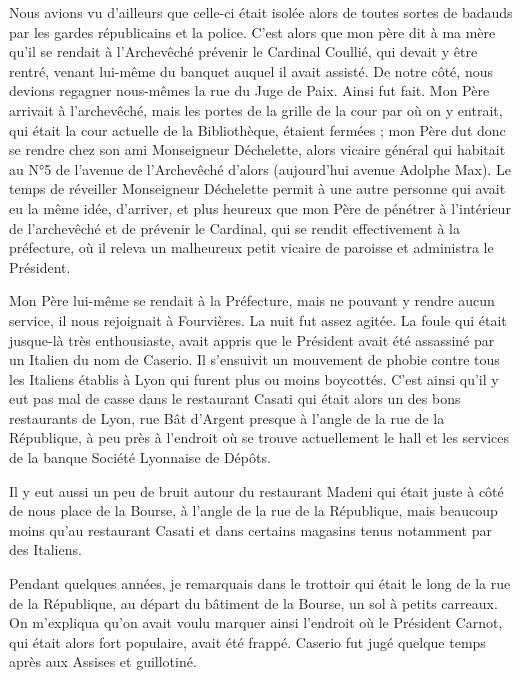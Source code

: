 \documentclass[11pt,a4paper]{report}
\begin{document}
Nous avions vu d'ailleurs que celle-ci était isolée alors de toutes sortes de badauds par les gardes républicains et la police. C'est alors que mon père dit à ma mère qu'il se rendait à l'Archevêché prévenir le Cardinal Coullié, qui devait y être rentré, venant lui-même du banquet auquel il avait assisté. De notre côté, nous devions regagner nous-mêmes la rue du Juge de Paix. Ainsi fut fait. Mon Père arrivait à l'archevêché, mais les portes de la grille de la cour par où on y entrait, qui était la cour actuelle de la Bibliothèque, étaient fermées ; mon Père dut donc se rendre chez son ami Monseigneur Déchelette, alors vicaire général qui habitait au N°5 de l'avenue de l'Archevêché d'alors (aujourd'hui avenue Adolphe Max). Le temps de réveiller Monseigneur Déchelette permit à une autre personne qui avait eu la même idée, d'arriver, et plus heureux que mon Père de pénétrer à l'intérieur de l'archevêché et de prévenir le Cardinal, qui se rendit effectivement à la préfecture, où il releva un malheureux petit vicaire de paroisse et administra le Président.

Mon Père lui-même se rendait à la Préfecture, mais ne pouvant y rendre aucun service, il nous rejoignait à Fourvières. La nuit fut assez agitée. La foule qui était jusque-là très enthousiaste, avait appris que le Président avait été assassiné par un Italien du nom de Caserio. Il s'ensuivit un mouvement de phobie contre tous les Italiens établis à Lyon qui furent plus ou moins boycottés. C'est ainsi qu'il y eut pas mal de casse dans le restaurant Casati qui était alors un des bons restaurants de Lyon, rue Bât d'Argent presque à l'angle de la rue de la République, à peu près à l'endroit où se trouve actuellement le hall et les services de la banque Société Lyonnaise de Dépôts.

Il y eut aussi un peu de bruit autour du restaurant Madeni qui était juste à côté de nous place de la Bourse, à l'angle de la rue de la République, mais beaucoup moins qu'au restaurant Casati et dans certains magasins tenus notamment par des Italiens.

Pendant quelques années, je remarquais dans le trottoir qui était le long de la rue de la République, au départ du bâtiment de la Bourse, un sol à petits carreaux. On m'expliqua qu'on avait voulu marquer ainsi l'endroit où le Président Carnot, qui était alors fort populaire, avait été frappé. Caserio fut jugé quelque temps après aux Assises et guillotiné.
\end{document}
